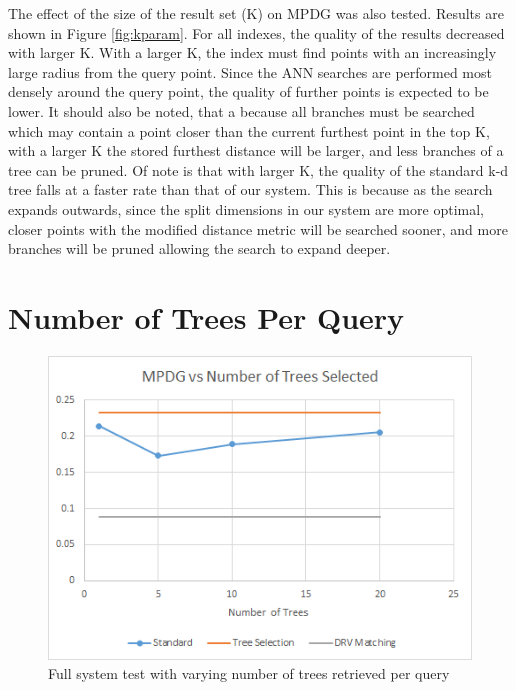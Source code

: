 The effect of the size of the result set (K) on MPDG was also tested.  Results are shown in Figure \ref{fig:kparam}.  For all indexes, the quality of the results decreased with larger K.  With a larger K, the index must find points with an increasingly large radius from the query point.  Since the ANN searches are performed most densely around the query point, the quality of further points is expected to be lower.  It should also be noted, that a because all branches must be searched which may contain a point closer than the current furthest point in the top K, with a larger K the stored furthest distance will be larger, and less branches of a tree can be pruned.  Of note is that with larger K, the quality of the standard k-d tree falls at a faster rate than that of our system.  This is because as the search expands outwards, since the split dimensions in our system are more optimal, closer points with the modified distance metric will be searched sooner, and more branches will be pruned allowing the search to expand deeper.

\section{Number of Trees Per Query}

\begin{figure}[h]
\begin{center}
\includegraphics[width=.85\textwidth]{Figures/treesel}
\end{center}
\caption{Full system test with varying number of trees retrieved per query}
\label{fig:treesel}
\end{figure}

